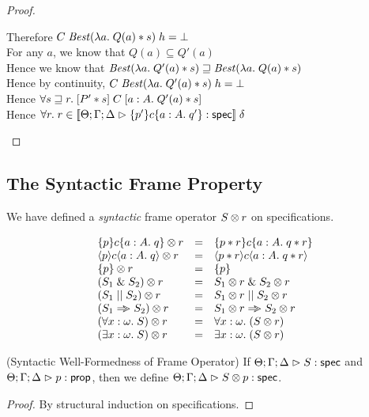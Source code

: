 \begin{proof}
\begin{tabbedproof}
\oooo Therefore $C\;\mathit{Best}(\lambda a.\;Q(a) * s)\;h = \bot$ \\
\oooo For any $a$, we know that $Q(a) \subseteq Q'(a)$ \\
\oooo Hence  we know that $\mathit{Best}(\lambda a.\;Q'(a) * s) \sqsupseteq \mathit{Best}(\lambda a.\;Q(a) * s)$ \\
\oooo Hence by continuity, $C\;\mathit{Best}(\lambda a.\;Q'(a) * s)\;h = \bot$ \\
\ooo Hence $\forall s \sqsupseteq r.\; [{P' * s}]\;{C}\;[{a:A}.\;{Q'(a) * s}]$ \\
\ooo Hence $\forall r.\; r \in [\![{{\Theta; \Gamma; \Delta} \vartriangleright {\{{p'}\}{c}\{{a:A}.\;{q'}\}} : \mathsf{spec}}]\!]\;\delta$ \\



\end{tabbedproof}
\end{proof}


\subsection{The Syntactic Frame Property}

We have defined a \emph{syntactic} frame operator ${S} \otimes {r}$ on
specifications.

\begin{displaymath}
  \begin{array}{lcl}
    {\{{p}\}{c}\{{a:A}.\;{q}\}} \otimes {r}    & = & \{{p * r}\}{c}\{{a:A}.\;{q * r}\} \\
    {\langle{p}\rangle{c}\langle{a:A}.\;{q}\rangle} \otimes {r}   & = & \langle{p * r}\rangle{c}\langle{a:A}.\;{q * r}\rangle \\
    {\{{p}\}} \otimes {r}              & = & \{{p}\} \\
    {(S_1 \;\&\; S_2)} \otimes {r}      & = & {S_1} \otimes {r} \;\&\; {S_2} \otimes {r} \\
    {(S_1 \;||\; S_2)} \otimes {r}       & = & {S_1} \otimes {r} \;||\; {S_2} \otimes {r} \\
    {(S_1 \Rightarrow\!\!\!> S_2)} \otimes {r}      & = & {S_1} \otimes {r} \Rightarrow\!\!\!> {S_2} \otimes {r} \\
    {(\forall x:\omega.\; S)} \otimes {r} & = & \forall x:\omega.\; ({S} \otimes {r}) \\
    {(\exists x:\omega.\; S)} \otimes {r} & = & \exists x:\omega.\; ({S} \otimes {r}) \\
  \end{array}
\end{displaymath}

\begin{prop*}{(Syntactic Well-Formedness of Frame Operator)}
If ${\Theta; \Gamma; \Delta} \vartriangleright {S} : \mathsf{spec}$ and ${\Theta; \Gamma; \Delta} \vartriangleright {p} : {\mathsf{prop}}$, then
we define ${\Theta; \Gamma; \Delta} \vartriangleright {{S} \otimes {p}} : \mathsf{spec}$.  
\end{prop*}
\begin{proof}
  By structural induction on specifications.
\end{proof}

